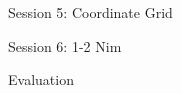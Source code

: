 \documentclass{beamer}  %
\begin{document}
\begin{frame}{Session 5: Coordinate Grid}

\end{frame}


\begin{frame}{Session 6: 1-2 Nim}

\end{frame}

\begin{frame}{Evaluation}

\end{frame}
\end{document}
